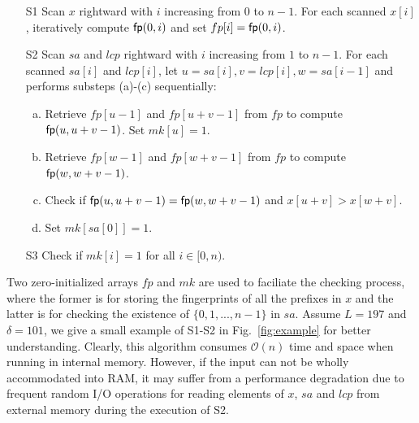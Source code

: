 \documentclass[10pt,journal,compsoc]{IEEEtran}
\begin{document}
\begin{enumerate}
	\item [S1]
	Scan $x$ rightward with $i$ increasing from $0$ to $n - 1$. For each scanned $x[i]$, iteratively compute ${\sf fp}(0, i)$ and set $fp[i] = {\sf fp}(0, i)$.
	
	\item [S2]
	Scan $sa$ and $lcp$ rightward with $i$ increasing from $1$ to $n - 1$. For each scanned $sa[i]$ and $lcp[i]$, let $u = sa[i], v = lcp[i], w = sa[i - 1]$ and performs substeps (a)-(c) sequentially:
	
	\begin{enumerate}[(a)]
		\item
		Retrieve $fp[u - 1]$ and $fp[u + v - 1]$ from $fp$ to compute ${\sf fp}(u, u + v - 1)$. Set $mk[u] = 1$.
		
		\item
		Retrieve $fp[w - 1]$ and $fp[w + v - 1]$ from $fp$ to compute ${\sf fp}(w, w + v - 1)$.
		
		\item
		Check if ${\sf fp}(u, u + v - 1) = {\sf fp}(w, w + v - 1)$ and $x[u + v] > x[w + v]$.
		
		\item
		Set $mk[sa[0]] = 1$.
	\end{enumerate}

	\item [S3] Check if $mk[i] = 1$ for all $i \in [0, n)$.
	
\end{enumerate}

Two zero-initialized arrays $fp$ and $mk$ are used to faciliate the checking process, where the former is for storing the fingerprints of all the prefixes in $x$ and the latter is for checking the existence of $\{0, 1, ..., n - 1\}$ in $sa$. Assume $L = 197$ and $\delta = 101$, we give a small example of S1-S2 in Fig.~\ref{fig:example} for better understanding. Clearly, this algorithm consumes $\mathcal{O}(n)$ time and space when running in internal memory. However, if the input can not be wholly accommodated into RAM, it may suffer from a performance degradation due to frequent random I/O operations for reading elements of $x$, $sa$ and $lcp$ from external memory during the execution of S2.
\end{document}
